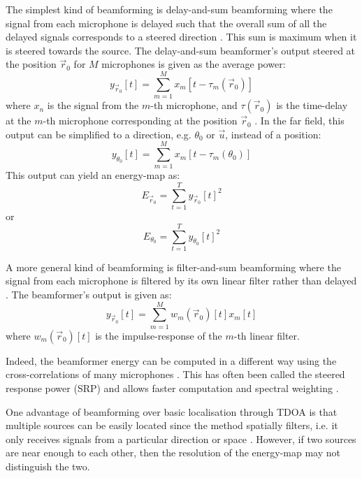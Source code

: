 \documentclass[notitlepage]{report}
\begin{document}
The simplest kind of beamforming is delay-and-sum beamforming where the signal from each microphone is delayed such that the overall sum of all the delayed signals corresponds to a steered direction \cite{rascon_localization_2017}. This sum is maximum when it is steered towards the source. The delay-and-sum beamformer's output steered at the position $\vec{r}_0$ for $M$ microphones is given as the average power:
\begin{equation}
y_{\vec{r}_0}[t] = \sum_{m=1}^M x_m[t-\tau_m(\vec{r}_0)] 
\end{equation}
where $x_n$ is the signal from the $m$-th microphone, and $\tau(\vec{r}_0)$ is the time-delay at the $m$-th microphone corresponding at the position $\vec{r}_0$ \cite{argentieri_survey_2015}. In the far field, this output can be simplified to a direction, e.g. $\theta_0$ or $\vec{u}$, instead of a position:
\begin{equation}
y_{\theta_0}[t] = \sum_{m=1}^M x_m[t-\tau_m(\theta_0)] 
\end{equation}
This output can yield an energy-map as:
\begin{equation}
E_{\vec{r}_0} = \sum_{t=1}^T y_{\vec{r}_0}[t]^2
\end{equation}
or
\begin{equation}
E_{\theta_0} = \sum_{t=1}^T y_{\theta_0}[t]^2
\end{equation}

A more general kind of beamforming is filter-and-sum beamforming where the signal from each microphone is filtered by its own linear filter rather than delayed \cite{argentieri_survey_2015}. The beamformer's output is given as:
\begin{equation}
y_{\vec{r}_0}[t] = \sum_{m=1}^M w_m(\vec{r}_0)[t]x_m[t]
\end{equation} 
where $w_m(\vec{r}_0)[t]$ is the impulse-response of the $m$-th linear filter.

Indeed, the beamformer energy can be computed in a different way using the cross-correlations of many microphones \cite{valin_localization_2004} \cite{valin_robust_2007} \cite{argentieri_survey_2015} \cite{rascon_localization_2017}. This has often been called the steered response power (SRP) and allows faster computation and spectral weighting \cite{badali_evaluating_2009}. 

One advantage of beamforming over basic localisation through TDOA is that multiple sources can be easily located since the method spatially filters, i.e. it only receives signals from a particular direction or space \cite{rascon_localization_2017}. However, if two sources are near enough to each other, then the resolution of the energy-map may not distinguish the two.
\end{document}
